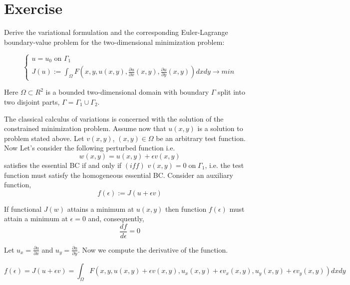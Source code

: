 \section{Exercise}
Derive the variational formulation and the corresponding Euler-Lagrange boundary-value
problem for the two-dimensional minimization problem:

\[ \begin{cases} 
      u = u_0 \text{ on } \Gamma_1 \\
      J(u):= \int_{\Omega} F(x,y,u(x,y),\frac{\partial u}{\partial x}(x,y),\frac{\partial u}{\partial y}(x,y))dxdy \longrightarrow min
   \end{cases}  
\]

\noindent
Here $\Omega \subset R^2$ is a bounded two-dimensional domain with boundary $\Gamma$ split into two disjoint parts, $\Gamma = \Gamma_1 \cup \Gamma_2$.


\noindent
The classical calculus of variations is concerned with the solution of the constrained minimization problem. Assume now that $u(x,y)$ is a solution to problem stated above. Let $v(x,y)$, $(x,y) \in \Omega$ be an arbitrary test function.\newline
Now Let's consider the following perturbed function i.e.
\begin{equation}
    w(x,y) = u(x,y) + \epsilon v(x,y)
\end{equation}
satisfies the essential BC if and only if $(iff)$ $v(x,y) = 0 \mathrm{\;on\;}\Gamma_1$, i.e. the test function must satisfy the homogeneous essential BC. Consider an auxiliary function,
\begin{equation}
    f(\epsilon) := J(u + \epsilon v)  
\end{equation}

\noindent
If functional $J(w)$ attains a minimum at $u(x,y)$ then function $f(\epsilon)$ must attain a minimum at  $\epsilon= 0$ and, consequently,
\begin{equation}
    \frac{df}{d\epsilon}=0
\end{equation}

\noindent Let $u_x=\frac{\partial u}{\partial x}$ and $u_y=\frac{\partial u}{\partial y}$. Now we compute the derivative of the function.

\begin{equation}
    f(\epsilon) = J(u+\epsilon v) = \int_{\Omega} F(x,y,u(x,y)+\epsilon v(x,y),u_x(x,y)+\epsilon v_x(x,y),u_y(x,y)+\epsilon v_y(x,y))dxdy
\end{equation}

